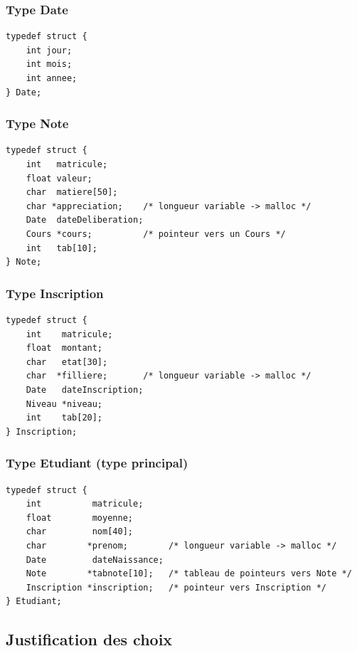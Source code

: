 \documentclass[12pt,a4paper]{article}
\begin{document}
\subsubsection{Type Date}

\begin{lstlisting}[caption={Structure Date}]
typedef struct {
    int jour;
    int mois;
    int annee;
} Date;
\end{lstlisting}

\subsubsection{Type Note}

\begin{lstlisting}[caption={Structure Note}]
typedef struct {
    int   matricule;
    float valeur;
    char  matiere[50];
    char *appreciation;    /* longueur variable -> malloc */
    Date  dateDeliberation;
    Cours *cours;          /* pointeur vers un Cours */
    int   tab[10];
} Note;
\end{lstlisting}

\subsubsection{Type Inscription}

\begin{lstlisting}[caption={Structure Inscription}]
typedef struct {
    int    matricule;
    float  montant;
    char   etat[30];
    char  *filliere;       /* longueur variable -> malloc */
    Date   dateInscription;
    Niveau *niveau;
    int    tab[20];
} Inscription;
\end{lstlisting}

\subsubsection{Type Etudiant (type principal)}

\begin{lstlisting}[caption={Structure Etudiant}]
typedef struct {
    int          matricule;
    float        moyenne;
    char         nom[40];
    char        *prenom;        /* longueur variable -> malloc */
    Date         dateNaissance;
    Note        *tabnote[10];   /* tableau de pointeurs vers Note */
    Inscription *inscription;   /* pointeur vers Inscription */
} Etudiant;
\end{lstlisting}

\subsection{Justification des choix}
\end{document}
